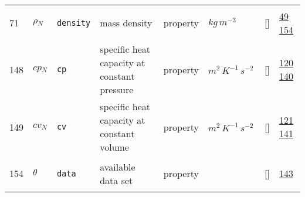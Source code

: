 \begin{longtable}{|p{1cm}|p{3cm}|p{3cm}|p{7cm}|p{3.0cm}|p{3cm}|p{2cm}|p{1cm}|}
    71
             & \hypertarget{"v:71"}{ $ {\rho}{_{N}} $}
             & \verb|density|
             & mass density
             & \begin{lay}property \end{lay}
             & $ kg \,m^{-3} \, $
             & []
             & \hyperlink{"e:49"}{ 49 }
                 \hyperlink{"e:154"}{ 154 }
                 \\
    148
             & \hypertarget{"v:148"}{ $ {cp}{_{N}} $}
             & \verb|cp|
             & specific heat capacity at constant pressure
             & \begin{lay}property \end{lay}
             & $ m^{2} \,K^{-1} \,s^{-2} \, $
             & []
             & \hyperlink{"e:120"}{ 120 }
                 \hyperlink{"e:140"}{ 140 }
                 \\
    149
             & \hypertarget{"v:149"}{ $ {cv}{_{N}} $}
             & \verb|cv|
             & specific heat capacity at constant volume
             & \begin{lay}property \end{lay}
             & $ m^{2} \,K^{-1} \,s^{-2} \, $
             & []
             & \hyperlink{"e:121"}{ 121 }
                 \hyperlink{"e:141"}{ 141 }
                 \\
    154
             & \hypertarget{"v:154"}{ $ {\theta}{_{}} $}
             & \verb|data|
             & available data set
             & \begin{lay}property \end{lay}
             & $  $
             & []
             & \hyperlink{"e:143"}{ 143 }
                 \\
    \end{longtable}
